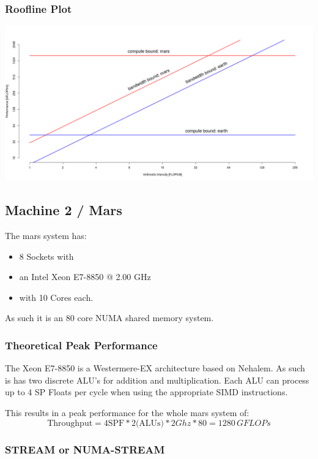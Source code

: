 \subsubsection{Roofline Plot}
\includegraphics[scale=0.4, angle=90]{roofline-earth-mars-pure.png}

\subsection{Machine 2 / Mars}

The mars system has:
 \begin{itemize}
 	\item 8 Sockets with
	\item an Intel Xeon E7-8850 @ 2.00 GHz
	\item with 10 Cores each.
\end{itemize}

As such it is an 80 core NUMA shared memory system.

\subsubsection{Theoretical Peak Performance}

The Xeon E7-8850 is a Westermere-EX architecture based on Nehalem.\cite{wikichip}
As such is has two discrete ALU's for addition and multiplication.
Each ALU can process up to 4 SP Floats per cycle when using the appropriate SIMD instructions.\cite{agnerorg}

This results in a peak performance for the whole mars system of:
$$\text{Throughput} = 4 \text{SPF} * 2 \text{(ALUs)} * 2 Ghz * 80 = 1280 \, GFLOPs$$

\subsubsection{STREAM or NUMA-STREAM}

